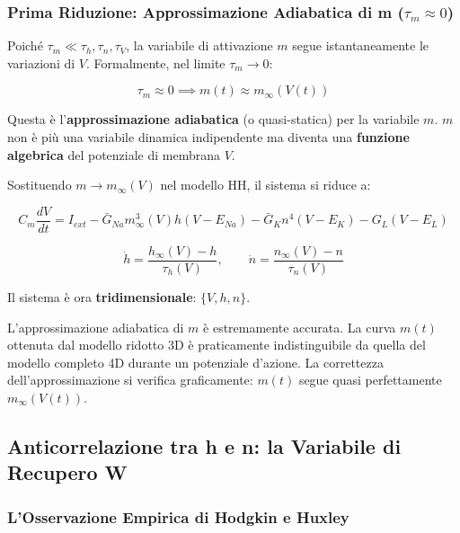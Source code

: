 \subsubsection{Prima Riduzione: Approssimazione Adiabatica di m ($\tau_m \approx 0$)}

Poiché $\tau_m \ll \tau_h, \tau_n, \tau_V$, la variabile di attivazione $m$ segue istantaneamente le variazioni di $V$. Formalmente, nel limite $\tau_m \to 0$:

\begin{equation}
\tau_m \approx 0 \implies m(t) \approx m_\infty(V(t))
\end{equation}

Questa è l'\textbf{approssimazione adiabatica} (o quasi-statica) per la variabile $m$. $m$ non è più una variabile dinamica indipendente ma diventa una \textbf{funzione algebrica} del potenziale di membrana $V$.

Sostituendo $m \to m_\infty(V)$ nel modello HH, il sistema si riduce a:

\begin{equation}
C_m \frac{dV}{dt} = I_{ext} - \bar{G}_{Na} m_\infty^3(V) h (V - E_{Na}) - \bar{G}_K n^4 (V - E_K) - G_L (V - E_L)
\end{equation}

\begin{equation}
\dot{h} = \frac{h_\infty(V) - h}{\tau_h(V)}, \qquad \dot{n} = \frac{n_\infty(V) - n}{\tau_n(V)}
\end{equation}

Il sistema è ora \textbf{tridimensionale}: $\{V, h, n\}$.

\begin{tcolorbox}[colback=gray!5, colframe=gray!40, arc=2mm, boxrule=0.5pt]
 L'approssimazione adiabatica di $m$ è estremamente accurata. La curva $m(t)$ ottenuta dal modello ridotto 3D è praticamente indistinguibile da quella del modello completo 4D durante un potenziale d'azione. La correttezza dell'approssimazione si verifica graficamente: $m(t)$ segue quasi perfettamente $m_\infty(V(t))$.
\end{tcolorbox}


\subsection{Anticorrelazione tra h e n: la Variabile di Recupero W}

\subsubsection{L'Osservazione Empirica di Hodgkin e Huxley}

